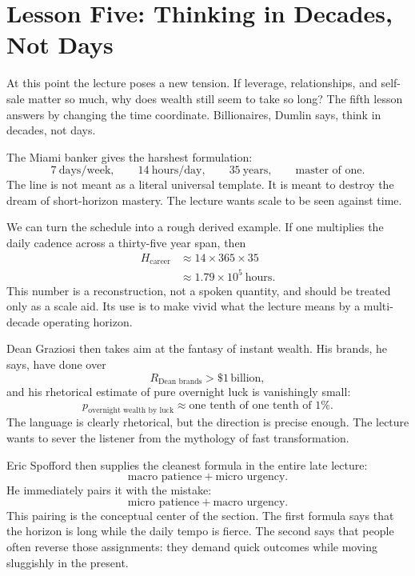 \section{Lesson Five: Thinking in Decades, Not Days}

At this point the lecture poses a new tension. If leverage, relationships, and self-sale matter so much, why does wealth still seem to take so long? The fifth lesson answers by changing the time coordinate. Billionaires, Dumlin says, think in decades, not days.

The Miami banker gives the harshest formulation:
\begin{equation}
7\ \text{days/week},
\qquad
14\ \text{hours/day},
\qquad
35\ \text{years},
\qquad
\text{master of one}.
\end{equation}
The line is not meant as a literal universal template. It is meant to destroy the dream of short-horizon mastery. The lecture wants scale to be seen against time.

We can turn the schedule into a rough derived example. If one multiplies the daily cadence across a thirty-five year span, then
\begin{align}
H_{\text{career}}
&\approx 14 \times 365 \times 35 \\
&\approx 1.79\times 10^5\ \text{hours}.
\end{align}
This number is a reconstruction, not a spoken quantity, and should be treated only as a scale aid. Its use is to make vivid what the lecture means by a multi-decade operating horizon.

Dean Graziosi then takes aim at the fantasy of instant wealth. His brands, he says, have done over
\begin{equation}
R_{\text{Dean brands}} > \$1\,\text{billion},
\end{equation}
and his rhetorical estimate of pure overnight luck is vanishingly small:
\begin{equation}
p_{\text{overnight wealth by luck}} \approx \text{one tenth of one tenth of }1\%.
\end{equation}
The language is clearly rhetorical, but the direction is precise enough. The lecture wants to sever the listener from the mythology of fast transformation.

Eric Spofford then supplies the cleanest formula in the entire late lecture:
\begin{equation}
\text{macro patience} + \text{micro urgency}.
\end{equation}
He immediately pairs it with the mistake:
\begin{equation}
\text{micro patience} + \text{macro urgency}.
\end{equation}
This pairing is the conceptual center of the section. The first formula says that the horizon is long while the daily tempo is fierce. The second says that people often reverse those assignments: they demand quick outcomes while moving sluggishly in the present.

